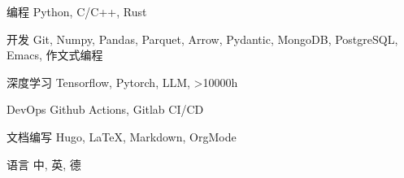 \documentclass[../cv.tex]{subfiles}
\begin{document}


\begin{cvskills}

  \cvskill
    {编程} %
    {Python, C/C++, Rust} %

  \cvskill
    {开发} %
    {Git, Numpy, Pandas, Parquet, Arrow, Pydantic, MongoDB, PostgreSQL, Emacs, 作文式编程} %

  \cvskill
    {深度学习} %
    {Tensorflow, Pytorch, LLM, >10000h} %

  \cvskill
    {DevOps} %
    {Github Actions, Gitlab CI/CD} %

  \cvskill
    {文档编写} %
    {Hugo, LaTeX, Markdown, OrgMode} %

  \cvskill
    {语言} %
    {中, 英, 德} %

\end{cvskills}
\end{document}

